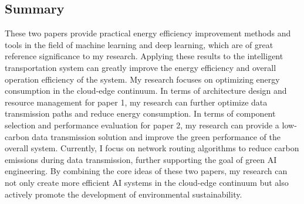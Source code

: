 \documentclass[11pt]{report}
\begin{document}
\subsection{Summary}
\label{summary}

These two papers provide practical energy efficiency improvement methods and tools in the field of machine learning and deep learning, which are of great reference significance to my research. Applying these results to the intelligent transportation system can greatly improve the energy efficiency and overall operation efficiency of the system. My research focuses on optimizing energy consumption in the cloud-edge continuum. In terms of architecture design and resource management for paper 1, my research can further optimize data transmission paths and reduce energy consumption. In terms of component selection and performance evaluation for paper 2, my research can provide a low-carbon data transmission solution and improve the green performance of the overall system. Currently, I focus on network routing algorithms to reduce carbon emissions during data transmission, further supporting the goal of green AI engineering. By combining the core ideas of these two papers, my research can not only create more efficient AI systems in the cloud-edge continuum but also actively promote the development of environmental sustainability.

\renewcommand\bibname{References}



\end{document}
